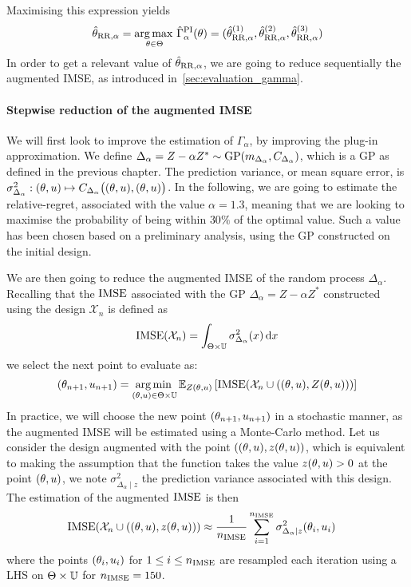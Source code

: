 \documentclass[../../Main_ManuscritThese.tex]{subfiles}
\begin{document}
Maximising this expression yields
\begin{equation}
  \hat{\theta}_{\mathrm{RR},\alpha} = \operatorname*{arg\,max \,}_{\theta\in\Theta} \hat{\Gamma}^{\mathrm{PI}}_{\alpha}(\theta) = (\hat{\theta}^{(1)}_{\mathrm{RR},\alpha}, \hat{\theta}^{(2)}_{\mathrm{RR},\alpha},\hat{\theta}^{(3)}_{\mathrm{RR},\alpha})
\end{equation}
In order to get a relevant value of $\hat{\theta}_{\mathrm{RR},\alpha}$,
we are going to reduce sequentially the augmented IMSE, as introduced
in~\cref{sec:evaluation_gamma}.

\paragraph{Stepwise reduction of the augmented IMSE}
We will first look to improve the estimation of $\Gamma_{\alpha}$, by
improving the plug-in approximation. We define
$\Delta_{\alpha} = Z - \alpha Z^* \sim \operatorname{\mathrm{GP}}(m_{\Delta_{\alpha}},
C_{\Delta_\alpha})$, which is a GP as defined in the previous chapter.
The prediction variance, or mean square error, is
$\sigma^2_{\Delta_{\alpha}}: (\theta, u) \mapsto
C_{\Delta_{\alpha}}\big((\theta, u), (\theta, u) \big)$. In the
following, we are going to estimate the relative-regret, associated
with the value $\alpha=1.3$, meaning that we are looking to maximise
the probability of being within $30\%$ of the optimal value. Such a
value has been chosen based on a preliminary analysis, using the GP
constructed on the initial design.


We are then going to reduce the augmented IMSE of the random process
$\Delta_{\alpha}$. Recalling that the $\operatorname{\mathrm{IMSE}}$ associated with the GP
$\Delta_{\alpha}=Z-\alpha Z^*$ constructed using the design
$\mathcal{X}_n$ is defined as
\begin{equation}
  \operatorname{\mathrm{IMSE}}(\mathcal{X}_n) = \int_{\Theta \times \mathbb{U}} \sigma^2_{\Delta_{\alpha}}(x) \,\mathrm{d}x
\end{equation}
we select the next point to evaluate as:
\begin{equation}
  \label{eq:aIMSE_criterion}
  (\theta_{n+1}, u_{n+1}) = \operatorname*{arg\,min \,}_{(\theta,u)\in\Theta\times \mathbb{U}} \mathbb{E}_{Z(\theta, u)}\left[\operatorname{\mathrm{IMSE}}(\mathcal{X}_n \cup \left((\theta, u), Z(\theta, u)\right))\right]
\end{equation}
In practice, we will choose the new point $(\theta_{n+1}, u_{n+1})$ in
a stochastic manner, as the augmented IMSE will be estimated using a
Monte-Carlo method.
Let us consider the design augmented with the point
$ \left((\theta, u), z(\theta, u)\right)$, which is equivalent to making the
assumption that the function takes the value $z(\theta, u)>0$ at the
point $(\theta,u)$, we note $\sigma_{{\Delta_\alpha} \mid z}^2$ the
prediction variance associated with this design. The estimation of
the augmented $\operatorname{\mathrm{IMSE}}$ is then
\begin{align}
  \operatorname{\mathrm{IMSE}}(\mathcal{X}_n\cup \left((\theta, u), z(\theta, u)\right) ) &\approx \frac{1}{n_{\operatorname{\mathrm{IMSE}}}} \sum_{i=1}^{n_{\operatorname{\mathrm{IMSE}}}} \sigma_{\Delta_{\alpha} \mid z}^2(\theta_i, u_i)
\end{align}
where the points $(\theta_i, u_i)$ for $1\leq i \leq n_{\operatorname{\mathrm{IMSE}}}$ are
resampled each iteration using a LHS on $\Theta \times \mathbb{U}$ for
$n_{\operatorname{\mathrm{IMSE}}}=150$.
\end{document}
